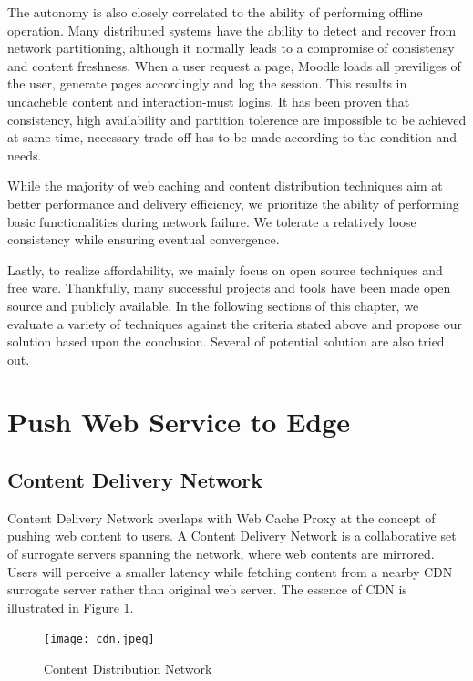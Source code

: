The autonomy is also closely correlated to the ability of performing offline operation. Many distributed systems have the ability to detect and recover from network partitioning, although it normally leads to a compromise of consistensy and content freshness. When a user request a page, Moodle loads all previliges of the user, generate pages accordingly and log the session. This results in uncacheble content and interaction-must logins. It has been proven that consistency, high availability and partition tolerence are impossible to be achieved at same time\cite{brewer2000towards}\cite{gilbert2002brewer}, necessary trade-off has to be made according to the condition and needs.

While the majority of web caching and content distribution techniques aim at better performance and delivery efficiency, we prioritize the ability of performing basic functionalities during network failure. We tolerate a relatively loose consistency while ensuring eventual convergence.

Lastly, to realize affordability, we mainly focus on open source techniques and free ware. Thankfully, many successful projects and tools have been made open source and publicly available. In the following sections of this chapter, we evaluate a variety of techniques against the criteria stated above and propose our solution based upon the conclusion. Several of potential solution are also tried out.


\section{Push Web Service to Edge}
\subsection{Content Delivery Network}
Content Delivery Network overlaps with Web Cache Proxy at the concept of pushing web content to users. A Content Delivery Network is a collaborative set of surrogate servers spanning the network, where web contents are mirrored\cite{pathan2008content}. Users will perceive a smaller latency while fetching content from a nearby CDN surrogate server rather than original web server. The essence of CDN is illustrated in Figure \ref{cdn}.

\begin{figure}[htbp]
\centering
\texttt{[image: cdn.jpeg]}
\caption{Content Distribution Network}
\label{cdn}
\end{figure}

